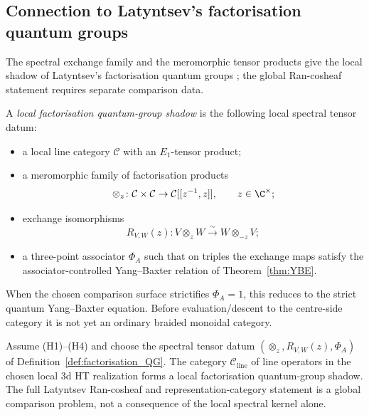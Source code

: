 \subsection{Connection to Latyntsev's factorisation quantum groups}

The spectral exchange family and the meromorphic tensor products give
the local shadow of Latyntsev's factorisation quantum groups
\cite{Lat23}; the global Ran-cosheaf statement requires separate
comparison data.

\begin{definition}
A \emph{local factorisation quantum-group shadow} is the following
local spectral tensor datum:
\begin{itemize}
\item a local line category $\mathcal{C}$ with an \(E_1\)-tensor
product;
\item a meromorphic family of factorisation products
\[
\otimes_z\colon \mathcal C\times\mathcal C\to
\mathcal C[[z^{-1},z]],\qquad z\in\C^\times;
\]
\item exchange isomorphisms
\[
R_{V,W}(z)\colon V\otimes_z W\xrightarrow{\sim}W\otimes_{-z}V;
\]
\item a three-point associator \(\Phi_A\) such that on triples the
exchange maps satisfy the associator-controlled Yang--Baxter relation
of Theorem~\ref{thm:YBE}.
\end{itemize}
When the chosen comparison surface strictifies \(\Phi_A=1\), this
reduces to the strict quantum Yang--Baxter equation. Before
evaluation/descent to the centre-side category it is not yet an
ordinary braided monoidal category.
\end{definition}

\begin{theorem}
Assume \textrm{(H1)--(H4)} and choose the spectral tensor datum
\((\otimes_z,R_{V,W}(z),\Phi_A)\) of
Definition~\ref{def:factorisation_QG}.  The category
$\mathcal{C}_{\text{line}}$ of line operators in the chosen local
3d HT realization forms a local factorisation quantum-group shadow.
The full Latyntsev Ran-cosheaf and representation-category statement is
a global comparison problem, not a consequence of the local spectral
kernel alone.
\end{theorem}

